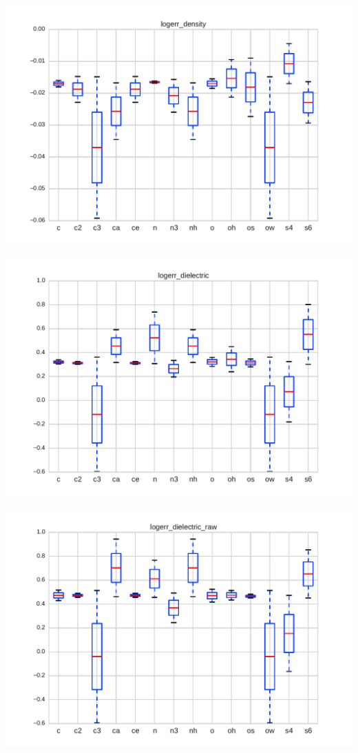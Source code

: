 \documentclass[aps,pre,twocolumn,nofootinbib,superscriptaddress,linenumbers]{revtex4-1}
\begin{document}

\includegraphics[width=\columnwidth]{./figures/functional_group_logerr_density.pdf}

\includegraphics[width=\columnwidth]{./figures/functional_group_logerr_dielectric.pdf}

\includegraphics[width=\columnwidth]{./figures/functional_group_logerr_dielectric_raw.pdf}
\end{document}
